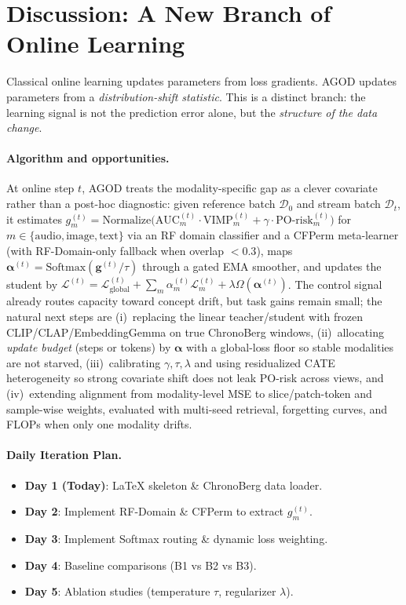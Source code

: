 \documentclass[11pt]{article}
\begin{document}
\section{Discussion: A New Branch of Online Learning}
\label{sec:discussion}

Classical online learning updates parameters from loss gradients. AGOD updates parameters from a \emph{distribution-shift statistic}. This is a distinct branch: the learning signal is not the prediction error alone, but the \emph{structure of the data change}.

\paragraph{Algorithm and opportunities.}
At online step \(t\), AGOD treats the modality-specific gap as a clever covariate rather than a post-hoc diagnostic: given reference batch \(\mathcal{D}_0\) and stream batch \(\mathcal{D}_t\), it estimates \(g_m^{(t)}=\mathrm{Normalize}\bigl(\mathrm{AUC}_m^{(t)}\cdot\mathrm{VIMP}_m^{(t)}+\gamma\cdot\mathrm{PO\text{-}risk}_m^{(t)}\bigr)\) for \(m\in\{\mathrm{audio},\mathrm{image},\mathrm{text}\}\) via an RF domain classifier and a CFPerm meta-learner (with RF-Domain-only fallback when overlap \(<0.3\)), maps \(\boldsymbol{\alpha}^{(t)}=\mathrm{Softmax}(\mathbf{g}^{(t)}/\tau)\) through a gated EMA smoother, and updates the student by \(\mathcal{L}^{(t)}=\mathcal{L}_{\mathrm{global}}^{(t)}+\sum_m\alpha_m^{(t)}\mathcal{L}_m^{(t)}+\lambda\Omega(\boldsymbol{\alpha}^{(t)})\). The control signal already routes capacity toward concept drift, but task gains remain small; the natural next steps are (i)~replacing the linear teacher/student with frozen CLIP/CLAP/EmbeddingGemma on true ChronoBerg windows, (ii)~allocating \emph{update budget} (steps or tokens) by \(\boldsymbol{\alpha}\) with a global-loss floor so stable modalities are not starved, (iii)~calibrating \(\gamma,\tau,\lambda\) and using residualized CATE heterogeneity so strong covariate shift does not leak PO-risk across views, and (iv)~extending alignment from modality-level MSE to slice/patch-token and sample-wise weights, evaluated with multi-seed retrieval, forgetting curves, and FLOPs when only one modality drifts.

\paragraph{Daily Iteration Plan.}
\begin{itemize}
    \item \textbf{Day 1 (Today)}: LaTeX skeleton \& ChronoBerg data loader.
    \item \textbf{Day 2}: Implement RF-Domain \& CFPerm to extract \(g_m^{(t)}\).
    \item \textbf{Day 3}: Implement Softmax routing \& dynamic loss weighting.
    \item \textbf{Day 4}: Baseline comparisons (B1 vs B2 vs B3).
    \item \textbf{Day 5}: Ablation studies (temperature \(\tau\), regularizer \(\lambda\)).
\end{itemize}
\end{document}
